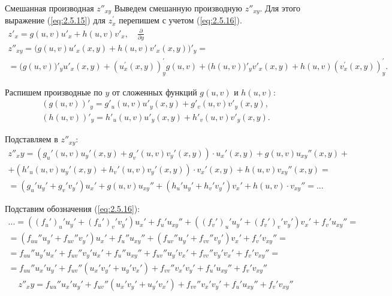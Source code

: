 \begin{tbox}{Смешанная производная $z''_{xy}$}
	Выведем смешанную производную $z''_{xy}$. Для этого выражение (\ref{eq:2.5.15}) для $z_x^{\prime}$ перепишем с учетом (\ref{eq:2.5.16}).
	\begin{gather*}
		z'_x = g(u,v) u'_x + h(u,v) v'_x, \quad \frac{\partial}{\partial y}\\
		z''_{xy} = \big(g(u,v) u'_x(x,y) + h(u,v) v'_x(x,y)\big)'_y =\\
		= \big(g(u,v)\big)'_y u'_x(x,y) + \left(u_x^{\prime}(x,y)\right)^{\prime}_y g(u, v) + \big(h(u,v)\big)'_y v'_x(x,y) + h(u, v) \left(v_x^{\prime}(x,y)\right)^{\prime}_y.
	\end{gather*}

	Распишем производные по $y$ от сложенных функций $g(u,v)$ и $h(u,v)$:
	\begin{gather*}
		(g(u,v))'_y = g'_u(u,v) u'_y(x,y) + g'_v(u,v) v'_y(x,y),\\
		(h(u,v))'_y = h'_u(u,v) u'_y(x,y) + h'_v(u,v) v'_y(x,y).
	\end{gather*}

	Подставляем в $z''_{xy}$:
	\begin{gather*}
		z''_xy = (g_u'(u,v) u_y'(x,y)+g_v'(u,v)v_y'(x,y)) \cdot u_x'(x, y) + g(u, v) u_{xy}''(x,y) + \\ +(h'_u(u, v) u_y'(x,y) + h_v'(u, v) v_y'(x,y)) \cdot v_x'(x,y) + h(u, v) v_{xy}''(x,y) = \\
		=(g_u' u_y' + g_v' v_y') u_x' + g(u, v) u_{xy}'' + (h_u' u_y' + h_v' v_y') v_x' + h(u, v) \cdot v_{xy}'' = ...
	\end{gather*}

	Подставим обозначения (\ref{eq:2.5.16}):
	\begin{gather*}
		... = \left((f_u')_u' u_y' + (f_u')_v' v_y'\right) u_x' + f_u' u_{xy}'' + \left((f_v')_u' u_y' + (f_v')_v' v_y'\right) v_x' + f_v' u_{xy}'' = \\
		= (f_{uu}'' u_y' + f_{uv}'' v_y') u_x' + f_u'' u_{xy}'' + (f_{uv}'' u_y' + f_{vv}'' v_y') v_x' + f_v' v_{xy}'' = \\
		= f_{uu}'' u_y' u_x' + f_{uv}'' v_y' u_x' + f_u'' u_{xy}'' + f_{uv}'' u_y' v_x' + f_{vv}'' v_y' v_x' + f_v' v_{xy}'' = \\
		= f_{uu}'' u_x' u_y' + f_{uv}''(u_x' v_y' + u_y' v_x') + f_{vv}'' v_x' v_y' + f_u' u_{xy}'' + f_v' v_{xy}''
	\end{gather*}
	\begin{align} \label{eq:2.5.18}
		\boxed{z''_xy = f_{uu}'' u_x' u_y' + f_{uv}''(u_x' v_y' + u_y' v_x') + f_{vv}'' v_x' v_y' + f_u' u_{xy}'' + f_v' v_{xy}''}
	\end{align}
\end{tbox}